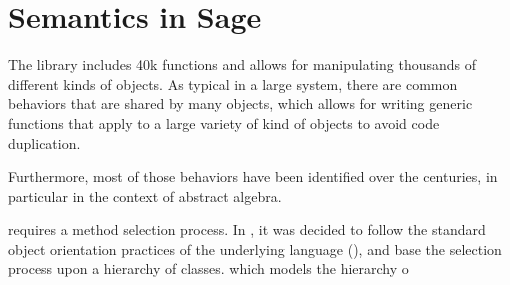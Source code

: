 \section{Semantics in Sage}

The \Sage library includes 40k functions and allows for manipulating thousands of
different kinds of objects. As typical in a large system, there are common behaviors that
are shared by many objects, which allows for writing generic functions that apply to a
large variety of kind of objects to avoid code duplication.

Furthermore, most of those behaviors have been identified over the centuries, in
particular in the context of abstract algebra.

requires a method selection process. In \Sage, it was decided to follow the standard
object orientation practices of the underlying language (\Python), and base the selection
process upon a hierarchy of classes.  which models the hierarchy o





